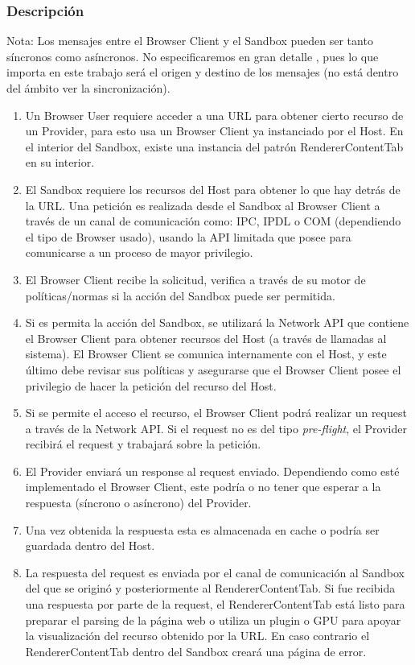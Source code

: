 \subsubsection{Descripción}
Nota: Los mensajes entre el Browser Client y el Sandbox pueden ser tanto síncronos como asíncronos. No especificaremos en gran detalle , pues lo que importa en este trabajo será el origen y destino de los mensajes (no está dentro del ámbito ver la sincronización).
	\begin{enumerate}
		\item Un Browser User requiere acceder a una URL para obtener cierto recurso de un Provider, para esto usa un Browser Client ya instanciado por el Host. En el interior del Sandbox, existe una instancia del patrón RendererContentTab en su interior. 
\item El Sandbox requiere los recursos del Host para obtener lo que hay detrás de la URL. Una petición es realizada desde el Sandbox al Browser Client a través de un canal de comunicación como: IPC, IPDL o COM (dependiendo el tipo de Browser usado), usando la API limitada que posee para comunicarse a un proceso de mayor privilegio. 
\item El Browser Client recibe la solicitud, verifica a través de su motor de políticas/normas si la acción del Sandbox puede ser permitida.
\item Si es permita la acción del Sandbox, se utilizará la Network API que contiene el Browser Client para obtener recursos del Host (a través de llamadas al sistema). El Browser Client se comunica internamente con el Host, y este último debe revisar sus políticas y asegurarse que el Browser Client posee el privilegio de hacer la petición del recurso del Host.
\item Si se permite el acceso el recurso, el Browser Client podrá realizar un request a través de la Network API. Si el request no es del tipo \textit{pre-flight}, el Provider recibirá el request y trabajará sobre la petición.
\item El Provider enviará un response al request enviado. Dependiendo como esté implementado el Browser Client, este podría o no tener que esperar a la respuesta (síncrono o asíncrono) del Provider.
\item Una vez obtenida la respuesta esta es almacenada en cache o podría ser guardada dentro del Host. 
\item La respuesta del request es enviada por el canal de comunicación al Sandbox del que se originó y posteriormente al RendererContentTab. Si fue recibida una respuesta por parte de la request, el RendererContentTab está listo para preparar el parsing de la página web o utiliza un plugin o GPU para apoyar la visualización del recurso obtenido por la URL. En caso contrario el RendererContentTab dentro del Sandbox creará una página de error.
	\end{enumerate}

